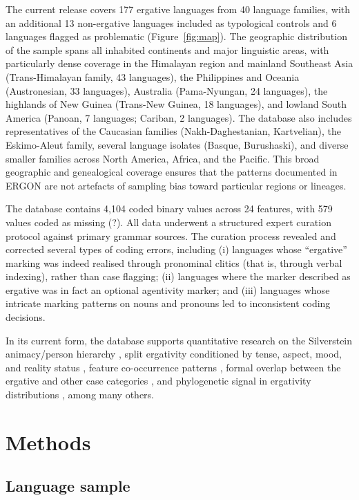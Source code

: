 \documentclass[12pt,a4paper]{article}
\begin{document}
The current release covers 177 ergative languages from 40 language families, with an additional 13 non-ergative languages included as typological controls and 6 languages flagged as problematic (Figure~\ref{fig:map}). The geographic distribution of the sample spans all inhabited continents and major linguistic areas, with particularly dense coverage in the Himalayan region and mainland Southeast Asia (Trans-Himalayan family, 43 languages), the Philippines and Oceania (Austronesian, 33 languages), Australia (Pama-Nyungan, 24 languages), the highlands of New Guinea (Trans-New Guinea, 18 languages), and lowland South America (Panoan, 7 languages; Cariban, 2 languages). The database also includes representatives of the Caucasian families (Nakh-Daghestanian, Kartvelian), the Eskimo-Aleut family, several language isolates (Basque, Burushaski), and diverse smaller families across North America, Africa, and the Pacific. This broad geographic and genealogical coverage ensures that the patterns documented in ERGON are not artefacts of sampling bias toward particular regions or lineages.

The database contains 4,104 coded binary values across 24 features, with 579 values coded as missing (?). All data underwent a structured expert curation protocol against primary grammar sources. The curation process revealed and corrected several types of coding errors, including (i) languages whose ``ergative'' marking was indeed realised through pronominal clitics (that is, through verbal indexing), rather than case flagging; (ii) languages where the marker described as ergative was in fact an optional agentivity marker; and (iii) languages whose intricate marking patterns on nouns and pronouns led to inconsistent coding decisions.

In its current form, the database supports quantitative research on the Silverstein animacy/person hierarchy \cite{silverstein1976}, split ergativity conditioned by tense, aspect, mood, and reality status \cite{dixon1994,givon2001}, feature co-occurrence patterns \cite{bybee1994}, formal overlap between the ergative and other case categories \cite{blake2001}, and phylogenetic signal in ergativity distributions \cite{greenhill2010,blasi2019}, among many others.

\section{Methods}

\subsection{Language sample}
\end{document}
